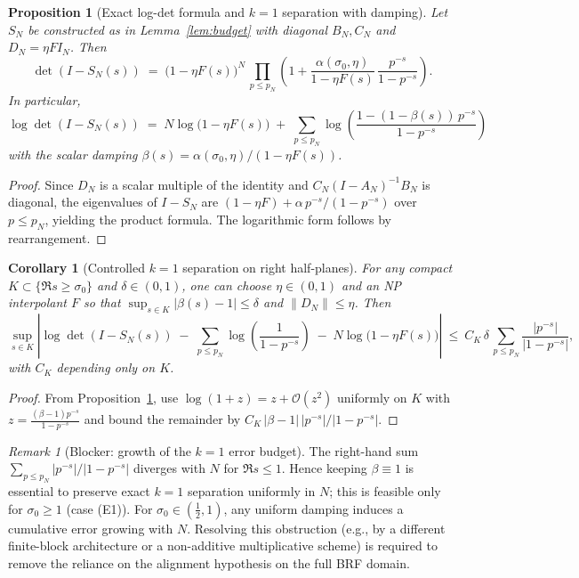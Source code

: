 \documentclass[11pt]{article}
\newtheorem{proposition}[theorem]{Proposition}
\newtheorem{corollary}[theorem]{Corollary}
\theoremstyle{definition}
\theoremstyle{remark}
\newtheorem{remark}[theorem]{Remark}
\begin{document}
\begin{proposition}[Exact log-det formula and $k=1$ separation with damping]\label{prop:logdet-S}
Let $S_N$ be constructed as in Lemma~\ref{lem:budget} with diagonal $B_N,C_N$ and $D_N=\eta F I_N$. Then
\[
 \det(I-S_N(s))\;=\;\big(1-\eta F(s)\big)^{N}\,\prod_{p\le p_N}\left(1+\frac{\alpha(\sigma_0,\eta)}{1-\eta F(s)}\,\frac{p^{-s}}{1-p^{-s}}\right).
\]
In particular,
\[
 \log\det(I-S_N(s))\;=\;N\log\big(1-\eta F(s)\big)\; +\; \sum_{p\le p_N}\log\left(\frac{1-(1-\beta(s))\,p^{-s}}{1-p^{-s}}\right)
\]
with the scalar damping $\beta(s)=\alpha(\sigma_0,\eta)/(1-\eta F(s))$.
\end{proposition}
\begin{proof}
Since $D_N$ is a scalar multiple of the identity and $C_N(I-A_N)^{-1}B_N$ is diagonal, the eigenvalues of $I-S_N$ are $(1-\eta F)+\alpha\, p^{-s}/(1-p^{-s})$ over $p\le p_N$, yielding the product formula. The logarithmic form follows by rearrangement.
\end{proof}

\begin{corollary}[Controlled $k=1$ separation on right half-planes]
For any compact $K\subset\{\Re s\ge \sigma_0\}$ and $\delta\in(0,1)$, one can choose $\eta\in(0,1)$ and an NP interpolant $F$ so that $\sup_{s\in K}|\beta(s)-1|\le \delta$ and $\|D_N\|\le \eta$. Then
\[
 \sup_{s\in K}\left|\log\det(I-S_N(s))\; -\; \sum_{p\le p_N}\log\!\left(\frac{1}{1-p^{-s}}\right)\; -\;N\log\big(1-\eta F(s)\big)\right|\ \le\ C_K\,\delta\,\sum_{p\le p_N}\frac{|p^{-s}|}{|1-p^{-s}|},
\]
with $C_K$ depending only on $K$.
\end{corollary}
\begin{proof}
From Proposition~\ref{prop:logdet-S}, use $\log(1+z)=z+\mathcal O(z^2)$ uniformly on $K$ with $z=\tfrac{(\beta-1)p^{-s}}{1-p^{-s}}$ and bound the remainder by $C_K\,|\beta-1|\,|p^{-s}|/|1-p^{-s}|$.
\end{proof}

\begin{remark}[Blocker: growth of the $k=1$ error budget]
The right-hand sum $\sum_{p\le p_N} |p^{-s}|/|1-p^{-s}|$ diverges with $N$ for $\Re s\le 1$. Hence keeping $\beta\equiv 1$ is essential to preserve exact $k=1$ separation uniformly in $N$; this is feasible only for $\sigma_0\ge 1$ (case (E1)). For $\sigma_0\in(\tfrac12,1)$, any uniform damping induces a cumulative error growing with $N$. Resolving this obstruction (e.g., by a different finite-block architecture or a non-additive multiplicative scheme) is required to remove the reliance on the alignment hypothesis on the full BRF domain.
\end{remark}
\end{document}
